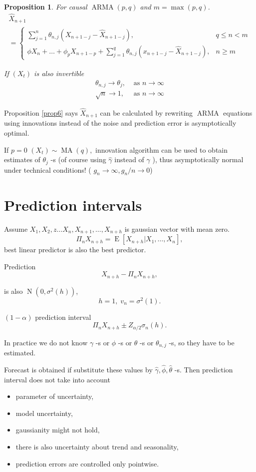 \documentclass[12pt,a4paper, notitlepage]{book}
\theoremstyle{definition} %
\theoremstyle{plain} %
\newtheorem{proposition}[justCounting]{Proposition}
\DeclareMathOperator{\E}{E}
\DeclareMathOperator{\No}{N}
\DeclareMathOperator{\Arma}{ARMA}
\DeclareMathOperator{\Ma}{MA}
\begin{document}
\begin{proposition}
For causal $ \Arma(p,q) $ and $ m = \max(p,q) $.
\begin{align*} \hat{X}_{n+1} \\ = 
 \begin{cases} 
\sum_{j=1}^n \theta_{n,j} (X_{n+1-j} - \hat{X}_{n+1-j} ) , & q \leq n <m \\
\phi X_n + \ldots + \phi _p X_{n+1-p} + \sum _{j=1}^q \theta_{n,j}\left( x_{n+1-j} - \hat{X}_{n+1-j} \right) , & n \geq m 
\end{cases}
\end{align*}

If $ (X_t) $ is also invertible
 \begin{align*}
\theta_{n,j} \to \theta _j, & \text{ as } n \to \infty \\
\sqrt{n} \to 1 , & \text{ as } n \to \infty 
\end{align*}
\label{prop:6}
\end{proposition}

Proposition \ref{prop6} says $ \hat{X} _{n+1} $ can be calculated by rewriting $ \Arma $ equations using 
innovations instead of the noise
and prediction error is asymptotically optimal.

If $ p= 0 $  $(X_t) \sim \Ma(q) , $ innovation algorithm can be used to
obtain estimates of  $ \theta_j$ -s (of course using $ \hat{\gamma} $ instead of $ \gamma $ ),
thus asymptotically normal under technical conditions!
( $ g_n \to \infty , g_n/n \to 0 $)


\section{ Prediction intervals}

Assume  $ X_1, X_2, z\ldots X_n, X_{n+1}, \ldots , X_{n+h} $ is gaussian vector with mean zero.
\[ \Pi_n X_{n+h} = \E[ X_{n+h} | X_1, \ldots , X_n ] , \]
best linear predictor is also the best predictor.

Prediction
\[ X_{n+h} - \Pi _n X_{n+h} , \]
 
is also $ \No(0, \sigma^2(h)) $,
\[ h=1, \; v_n = \sigma^2(1) . \]

$(1- \alpha) $ prediction interval
\[ \Pi _n X_{n+h} \pm Z_{\alpha/2} \sigma_n(h)  . \]

In practice we do not know $ \gamma $ -s or $ \phi $ -s or $ \theta $ -s or $ \theta_{n,j} $ -s,
so they have to be estimated.

Forecast is obtained if substitute these values by $ \hat{\gamma}, \hat{\phi}, \hat{\theta}$ -s.
Then prediction interval does not take into account
\begin{itemize}
\item parameter of uncertainty,
\item model uncertainty,
\item gaussianity might not hold,
\item there is also uncertainty about trend and seasonality,
\item prediction errors are controlled only pointwise.
\end{itemize}
\end{document}
